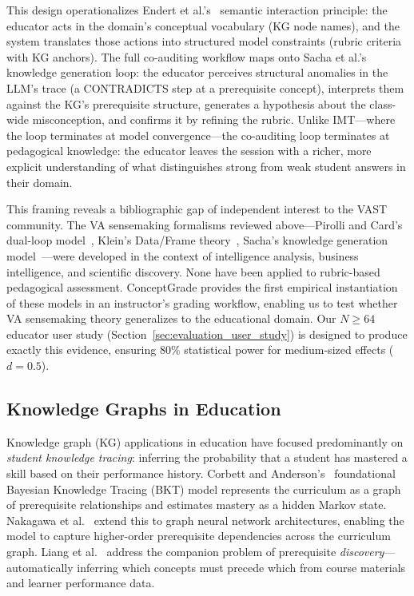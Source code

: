\documentclass[journal,review]{vgtc}
\begin{document}
This design operationalizes Endert et al.'s~\cite{Endert2017} semantic interaction principle: the educator acts in the domain's conceptual vocabulary (KG node names), and the system translates those actions into structured model constraints (rubric criteria with KG anchors). The full co-auditing workflow maps onto Sacha et al.'s~\cite{Sacha2014} knowledge generation loop: the educator perceives structural anomalies in the LLM's trace (a CONTRADICTS step at a prerequisite concept), interprets them against the KG's prerequisite structure, generates a hypothesis about the class-wide misconception, and confirms it by refining the rubric. Unlike IMT---where the loop terminates at model convergence---the co-auditing loop terminates at pedagogical knowledge: the educator leaves the session with a richer, more explicit understanding of what distinguishes strong from weak student answers in their domain.

This framing reveals a bibliographic gap of independent interest to the VAST community. The VA sensemaking formalisms reviewed above---Pirolli and Card's dual-loop model~\cite{Pirolli2005}, Klein's Data/Frame theory~\cite{Klein2007}, Sacha's knowledge generation model~\cite{Sacha2014}---were developed in the context of intelligence analysis, business intelligence, and scientific discovery. None have been applied to rubric-based pedagogical assessment. ConceptGrade provides the first empirical instantiation of these models in an instructor's grading workflow, enabling us to test whether VA sensemaking theory generalizes to the educational domain. Our $N\geq 64$ educator user study (Section~\ref{sec:evaluation_user_study}) is designed to produce exactly this evidence, ensuring 80\% statistical power for medium-sized effects ($d=0.5$).

\subsection{Knowledge Graphs in Education}

Knowledge graph (KG) applications in education have focused predominantly on \textit{student knowledge tracing}: inferring the probability that a student has mastered a skill based on their performance history. Corbett and Anderson's~\cite{Corbett1994} foundational Bayesian Knowledge Tracing (BKT) model represents the curriculum as a graph of prerequisite relationships and estimates mastery as a hidden Markov state. Nakagawa et al.~\cite{Nakagawa2019} extend this to graph neural network architectures, enabling the model to capture higher-order prerequisite dependencies across the curriculum graph. Liang et al.~\cite{Liang2018} address the companion problem of prerequisite \textit{discovery}---automatically inferring which concepts must precede which from course materials and learner performance data.
\end{document}
